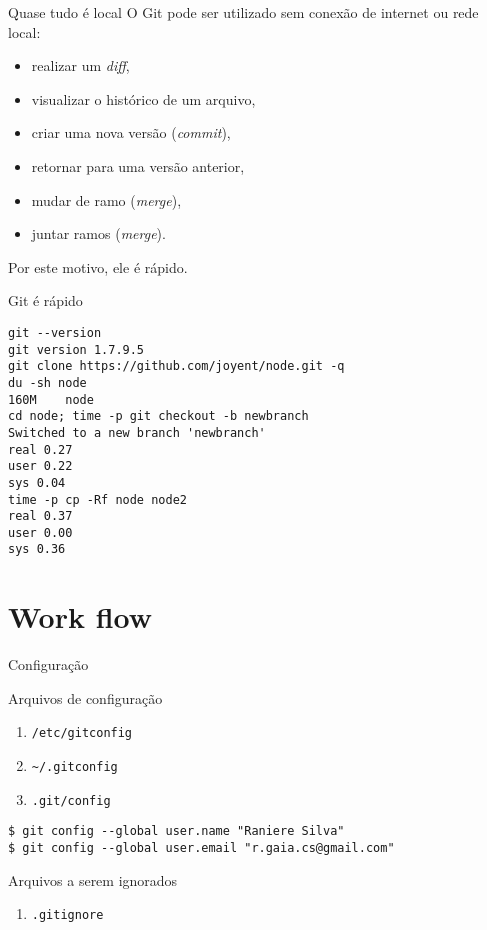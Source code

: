 \documentclass[11pt]{beamer}
\begin{document}
\begin{frame}{Quase tudo é local}
    O Git pode ser utilizado sem conexão de internet ou rede local:
    \begin{itemize}
        \item realizar um \textit{diff}, \pause
        \item visualizar o histórico de um arquivo, \pause
        \item criar uma nova versão (\textit{commit}), \pause
        \item retornar para uma versão anterior, \pause
        \item mudar de ramo (\textit{merge}), \pause
        \item juntar ramos (\textit{merge}). \pause
    \end{itemize}

    Por este motivo, ele é rápido.
\end{frame}

\begin{frame}[fragile]{Git é rápido}
    \begin{lstlisting}
git --version
git version 1.7.9.5
git clone https://github.com/joyent/node.git -q
du -sh node
160M    node
cd node; time -p git checkout -b newbranch
Switched to a new branch 'newbranch'
real 0.27
user 0.22
sys 0.04
time -p cp -Rf node node2
real 0.37
user 0.00
sys 0.36
    \end{lstlisting}
\end{frame}

\section{Work flow}
\begin{frame}[fragile]{Configuração}
    \begin{block}{Arquivos de configuração}
        \begin{enumerate}
            \item  \lstinline+/etc/gitconfig+
            \item  \lstinline+~/.gitconfig+
            \item  \lstinline+.git/config+
        \end{enumerate}
    \end{block}
    \pause
    \begin{lstlisting}
$ git config --global user.name "Raniere Silva"
$ git config --global user.email "r.gaia.cs@gmail.com"
    \end{lstlisting}
    \pause
    \begin{block}{Arquivos a serem ignorados}
        \begin{enumerate}
            \item \lstinline+.gitignore+
        \end{enumerate}
    \end{block}
\end{frame}
\end{document}
